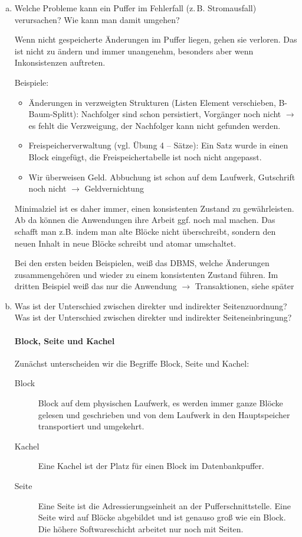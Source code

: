 \begin{enumerate}[a)]
	\item Welche Probleme kann ein Puffer im Fehlerfall (z.\,B. Stromausfall) verursachen? Wie kann man damit umgehen?

	\begin{solution}
	Wenn nicht gespeicherte Änderungen im Puffer liegen, gehen sie verloren. Das ist nicht zu ändern und immer unangenehm, besonders aber wenn Inkonsistenzen auftreten.

	Beispiele:
	\begin{itemize}
		\item Änderungen in verzweigten Strukturen (Listen Element verschieben, B-Baum-Splitt): Nachfolger sind schon persistiert, Vorgänger noch nicht $\rightarrow$ es fehlt die Verzweigung, der Nachfolger kann nicht gefunden werden.
		\item Freispeicherverwaltung (vgl. Übung 4 -- Sätze): Ein Satz wurde in einen Block eingefügt, die Freispeichertabelle ist noch nicht angepasst.
		\item Wir überweisen Geld. Abbuchung ist schon auf dem Laufwerk, Gutschrift noch nicht $\rightarrow$ Geldvernichtung
	\end{itemize}
	Minimalziel ist es daher immer, einen konsistenten Zustand zu gewährleisten. Ab da können die Anwendungen ihre Arbeit ggf. noch mal machen. Das schafft man z.B. indem man alte Blöcke nicht überschreibt, sondern den neuen Inhalt in neue Blöcke schreibt und atomar umschaltet.

	Bei den ersten beiden Beispielen, weiß das DBMS, welche Änderungen zusammengehören und wieder zu einem konsistenten Zustand führen. Im dritten Beispiel weiß das nur die Anwendung $\rightarrow$ Transaktionen, siehe später
	\end{solution}


	\item Was ist der Unterschied zwischen direkter und indirekter Seitenzuordnung? Was ist der Unterschied zwischen direkter und indirekter Seiteneinbringung?

	\begin{solution}

	\paragraph{Block, Seite und Kachel}
	Zunächst unterscheiden wir die Begriffe Block, Seite und Kachel:
	\begin{description}
		\item[Block] Block auf dem physischen Laufwerk, es werden immer ganze Blöcke gelesen und geschrieben und von dem Laufwerk in den Hauptspeicher transportiert und umgekehrt.
		\item[Kachel] Eine Kachel ist der Platz für einen Block im Datenbankpuffer. %
		\item[Seite] Eine Seite ist die Adressierungseinheit an der Pufferschnittstelle. Eine Seite wird auf Blöcke abgebildet und ist genauso groß wie ein Block. Die höhere Softwareschicht arbeitet nur noch mit Seiten.
	\end{description}



\end{solution}
\end{enumerate}
